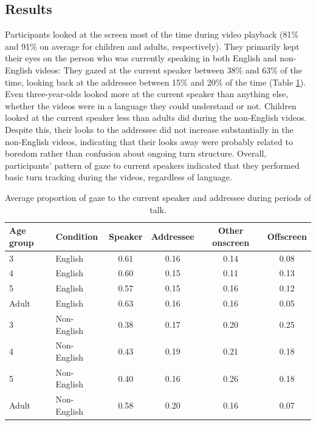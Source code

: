 \documentclass[authoryear, 12pt]{elsarticle}
\begin{document}
\subsection{Results}
\label{sec:results1}

Participants looked at the screen most of the time during video playback (81\% and 91\% on average for children and adults, respectively). They primarily kept their eyes on the person who was currently speaking in both English and non-English videos: They gazed at the current speaker between 38\% and 63\% of the time, looking back at the addressee between 15\% and 20\% of the time (Table \ref{tab:e1_look}). Even three-year-olds looked more at the current speaker than anything else, whether the videos were in a language they could understand or not. Children looked at the current speaker less than adults did during the non-English videos. Despite this, their looks to the addressee did not increase substantially in the non-English videos, indicating that their looks away were probably related to boredom rather than confusion about ongoing turn structure. Overall, participants' pattern of gaze to current speakers indicated that they performed basic turn tracking during the videos, regardless of language.

\begin{table}[t]
\begin{center}
  \begin{tabular}{llcccc}
    \hline
    Age group & Condition & Speaker & Addressee & Other onscreen & Offscreen\\ 
    \hline
    3 & English & 0.61 & 0.16 & 0.14 & 0.08 \\ 
    4 & English & 0.60 & 0.15 & 0.11 & 0.13 \\ 
    5 & English & 0.57 & 0.15 & 0.16 & 0.12 \\ 
    Adult & English & 0.63 & 0.16 & 0.16 & 0.05 \\ 
    3 & Non-English & 0.38 & 0.17 & 0.20 & 0.25 \\ 
    4 & Non-English & 0.43 & 0.19 & 0.21 & 0.18 \\ 
    5 & Non-English & 0.40 & 0.16 & 0.26 & 0.18 \\ 
    Adult & Non-English & 0.58 & 0.20 & 0.16 & 0.07 \\ 
    \hline
  \end{tabular}
\end{center}
  \caption{Average proportion of gaze to the current speaker and addressee during periods of talk.}
\label{tab:e1_look}
\end{table}
\end{document}

